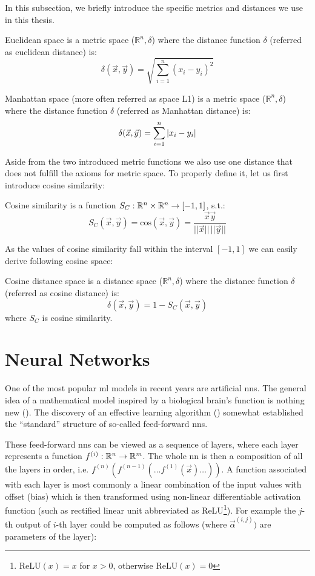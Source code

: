 In this subsection, we briefly introduce the specific metrics and distances we use in this thesis.

\begin{defn}
Euclidean space is a metric space ($\mathbb{R}^n, \delta$) where the
distance function $\delta$ (referred as euclidean distance) is:
$$\delta(\vec{x}, \vec{y}) = \sqrt{\sum_{i=1}^n(x_i - y_i)^2}$$
\end{defn}

\begin{defn}
Manhattan space (more often referred as space L1) is a metric
space ($\mathbb{R}^n, \delta$) where the
distance function $\delta$ (referred as Manhattan distance) is:
$$\delta(\vec{x}, \vec{y}) = \sum_{i=1}^n \left|{x_i - y_i}\right|$$
\end{defn}

Aside from the two introduced metric functions we also use one distance that does not fulfill the axioms for metric space. To properly define it, let us first introduce cosine similarity:

\begin{defn}
Cosine similarity is a function $S_C : \mathbb{R}^n \times \mathbb{R}^n \rightarrow [-1, 1]$, s.t.:
$$S_C(\vec{x}, \vec{y}) = \mathrm{cos}(\vec{x}, \vec{y}) = \frac{\vec{x}\vec{y}}{||\vec{x}||\,||\vec{y}||}$$
\end{defn}
As the values of cosine similarity fall within the interval $[-1,1]$ we can
easily derive following cosine space:
\begin{defn}
Cosine distance space is a distance space ($\mathbb{R}^n, \delta$) where the distance
function $\delta$ (referred as cosine distance) is:
$$\delta(\vec{x}, \vec{y}) = 1 - S_C(\vec{x}, \vec{y})$$
where $S_C$ is cosine similarity.
\end{defn}

\section{Neural Networks}
\label{sec:nn}

One of the most popular \gls{ml} models in recent years are artificial \glspl{nn}. The general idea of a mathematical model inspired by a biological brain's function is nothing new (\cite{first_nn}). The discovery of an effective learning algorithm (\cite{backprop}) somewhat established the ``standard'' structure of so-called feed-forward \glspl{nn}.

These feed-forward \glspl{nn} can be viewed as a sequence of layers, where each layer represents a function $f^{(i)}: \mathbb{R}^n \rightarrow \mathbb{R}^m$. The whole \gls{nn} is then a composition of all the layers in order, i.e. $f^{(n)}(f^{(n-1)}(\ldots f^{(1)}(\vec{x})\ldots))$. A function associated with each layer is most commonly a linear combination of the input values with offset (bias) which is then transformed using non-linear differentiable activation function (such as rectified linear unit abbreviated as ReLU\footnote{$\mathrm{ReLU}(x) = x$ for $x > 0$, otherwise $\mathrm{ReLU}(x) = 0$}). For example the $j$-th output of $i$-th layer could be computed as follows (where $\vec{\alpha}^{(i,j)})$ are parameters of the layer):

